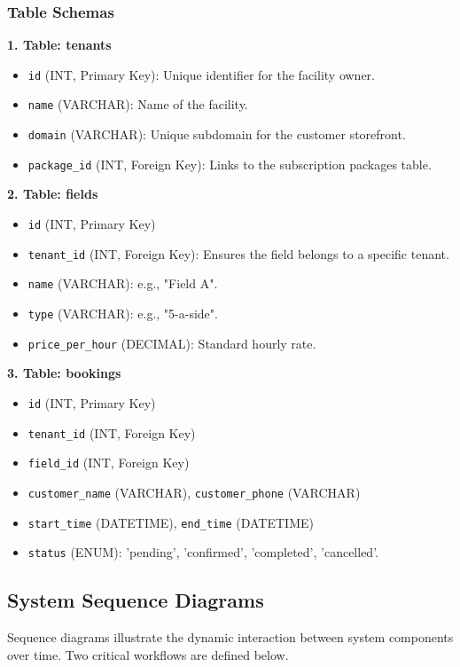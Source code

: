\subsubsection{Table Schemas}
\textbf{1. Table: tenants}
\begin{itemize}
    \item \texttt{id} (INT, Primary Key): Unique identifier for the facility owner.
    \item \texttt{name} (VARCHAR): Name of the facility.
    \item \texttt{domain} (VARCHAR): Unique subdomain for the customer storefront.
    \item \texttt{package\_id} (INT, Foreign Key): Links to the subscription packages table.
\end{itemize}

\textbf{2. Table: fields}
\begin{itemize}
    \item \texttt{id} (INT, Primary Key)
    \item \texttt{tenant\_id} (INT, Foreign Key): Ensures the field belongs to a specific tenant.
    \item \texttt{name} (VARCHAR): e.g., "Field A".
    \item \texttt{type} (VARCHAR): e.g., "5-a-side".
    \item \texttt{price\_per\_hour} (DECIMAL): Standard hourly rate.
\end{itemize}

\textbf{3. Table: bookings}
\begin{itemize}
    \item \texttt{id} (INT, Primary Key)
    \item \texttt{tenant\_id} (INT, Foreign Key)
    \item \texttt{field\_id} (INT, Foreign Key)
    \item \texttt{customer\_name} (VARCHAR), \texttt{customer\_phone} (VARCHAR)
    \item \texttt{start\_time} (DATETIME), \texttt{end\_time} (DATETIME)
    \item \texttt{status} (ENUM): 'pending', 'confirmed', 'completed', 'cancelled'.
\end{itemize}

\subsection{System Sequence Diagrams}

Sequence diagrams illustrate the dynamic interaction between system components over time. Two critical workflows are defined below.

